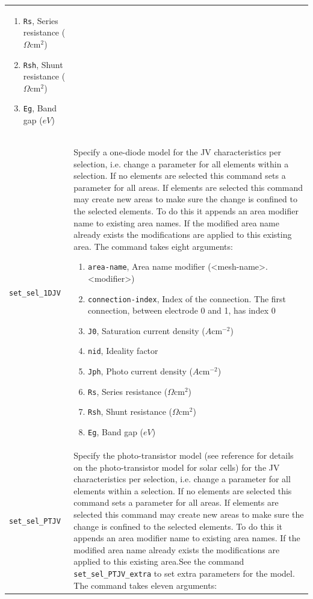 \documentclass[noshowpacs,preprintnumbers,amsmath,amssymb, letter]{revtex4}
\begin{document}
\begin{longtable}{p{}p{}}
\begin{enumerate}
\item \texttt{Rs}, Series resistance ($\Omega \text{cm}^2$)
\item \texttt{Rsh}, Shunt resistance ($\Omega \text{cm}^2$)
\item \texttt{Eg}, Band gap ($eV$)
\end{enumerate}\\
\texttt{set\_sel\_1DJV}	&  Specify a one-diode model for the JV characteristics per selection, i.e. change a parameter for all elements within a selection. If no elements are selected this command sets a parameter for all areas. If elements are selected this command may create new areas to make sure the change is confined to the selected elements. To do this it appends an area modifier name to existing area names. If the modified area name already exists the modifications are applied to this existing area. The command takes eight arguments:
\begin{enumerate}
\item \texttt{area-name}, Area name modifier (\textless mesh-name\textgreater .\textless modifier\textgreater )
\item \texttt{connection-index}, Index of the connection. The first connection, between electrode 0 and 1,  has index 0
\item \texttt{J0}, Saturation current density ($A \text{cm}^{-2}$)
\item \texttt{nid}, Ideality factor
\item \texttt{Jph}, Photo current density ($A \text{cm}^{-2}$)
\item \texttt{Rs}, Series resistance ($\Omega \text{cm}^2$)
\item \texttt{Rsh}, Shunt resistance ($\Omega \text{cm}^2$)
\item \texttt{Eg}, Band gap ($eV$)
\end{enumerate}\\
\texttt{set\_sel\_PTJV}	&  Specify the photo-transistor model (see reference \cite{Walter:photo-T} for details on the photo-transistor model for solar cells) for the JV characteristics per selection, i.e. change a parameter for all elements within a selection. If no elements are selected this command sets a parameter for all areas. If elements are selected this command may create new areas to make sure the change is confined to the selected elements. To do this it appends an area modifier name to existing area names. If the modified area name already exists the modifications are applied to this existing area.See the command \texttt{set\_sel\_PTJV\_extra} to set extra parameters for the model. The command takes eleven arguments:

\end{longtable}
\end{document}
